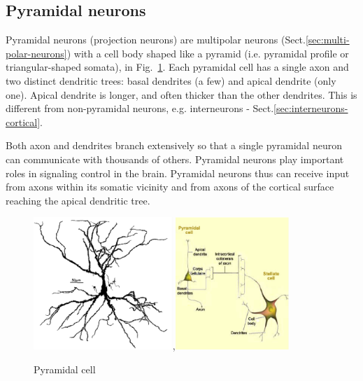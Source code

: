 \subsection{Pyramidal neurons}
\label{sec:pyramidal-neurons}

Pyramidal neurons (projection neurons) are multipolar neurons
(Sect.\ref{sec:multi-polar-neurons}) with a cell body shaped like a pyramid
(i.e. pyramidal profile or triangular-shaped somata), in
Fig.~\ref{fig:pyramidal}. Each pyramidal cell has a single axon and two distinct
dendritic trees:
basal dendrites (a few) and apical dendrite (only one). Apical dendrite is
longer, and often thicker than the other dendrites.
This is different from non-pyramidal neurons, e.g. interneurons -
Sect.\ref{sec:interneurons-cortical}.

Both axon and dendrites branch extensively so that a single pyramidal neuron can
communicate with thousands of others. Pyramidal neurons play important roles in
signaling control in the brain. Pyramidal neurons thus can receive input from axons
within its somatic vicinity and from axons of the cortical surface reaching
the apical dendritic tree.


\begin{figure}[hbt]
  \centerline{\includegraphics[height=5cm,
    angle=0]{./images/pyramidal_cell.eps},\includegraphics[height=5cm,
    angle=0]{./images/pyramidal_cell_02.eps}}
\caption{Pyramidal cell}
\label{fig:pyramidal}
\end{figure}

